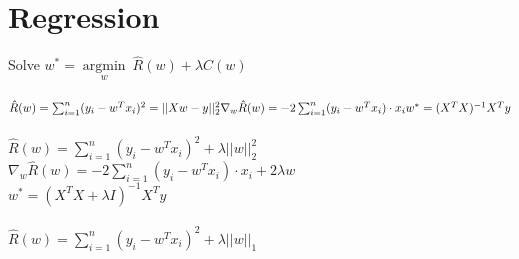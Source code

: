 
\section*{Regression}
Solve $w^* = \underset{w}{\operatorname{argmin}} ~ \hat{R}(w)+ \lambda C(w)$\\
\\
$\hat{R}(w) = \sum_{i=1}^n (y_i - w^Tx_i)^2 = ||Xw-y||^2_2\\
\nabla_w \hat{R}(w) = -2 \sum_{i=1}^n (y_i-w^T x_i) \cdot x_i \\
w^* = (X^T X)^{-1} X^T y$\\
\\
$\hat{R}(w) = \sum_{i=1}^n (y_i - w^Tx_i)^2 + \lambda ||w||_2^2$\\
$\nabla_w \hat{R}(w) = -2 \sum_{i=1}^n (y_i-w^T x_i) \cdot x_i + 2 \lambda w$\\
$w^*=(X^T X + \lambda I)^{-1} X^T y$\\
\\
$\hat{R}(w) = \sum_{i=1}^n (y_i - w^Tx_i)^2 + \lambda ||w||_1$